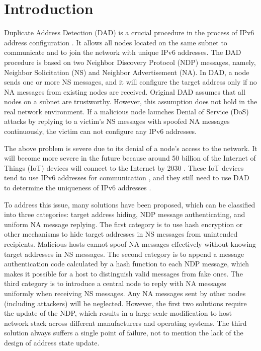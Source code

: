 \documentclass[a4paper,fleqn]{cas-dc}
\begin{document}
\maketitle

\section{Introduction}
    Duplicate Address Detection (DAD) is a crucial procedure in the process of IPv6 address configuration \cite{slaac}. It allows all nodes located on the same subnet to communicate and to join the network with unique IPv6 addresses. The DAD procedure is based on two Neighbor Discovery Protocol (NDP) \cite{NDP} messages, namely, Neighbor Solicitation (NS) and Neighbor Advertisement (NA).
    In DAD, a node sends one or more NS messages, and it will configure the target address only if no NA messages from existing nodes are received.
    Original DAD assumes that all nodes on a subnet are trustworthy. However, this assumption does not hold in the real network environment. 
    If a malicious node launches Denial of Service (DoS) attacks by replying to a victim's NS messages with spoofed NA messages continuously, the victim can not configure any IPv6 addresses.

    The above problem is severe due to its denial of a node's access to the network. 
    It will become more severe in the future because around 50 billion of the Internet of Things (IoT) devices will connect to the Internet by 2030 \cite{IOT3}. These IoT devices tend to use IPv6 addresses for communication  \cite{IoT-IPv6,LoWPAN}, and they still need to use DAD to determine the uniqueness of IPv6 addresses \cite{ipv6-iot}.
    
    To address this issue, many solutions have been proposed, which can be classified into three categories: target address hiding, NDP message authenticating, and uniform NA message replying. The first category is to use hash encryption or other mechanisms to hide target addresses in NS messages from unintended recipients. Malicious hosts cannot spoof NA messages effectively without knowing target addresses in NS messages.
    The second category is to append a message authentication code calculated by a hash function to each NDP message, which makes it possible for a host to distinguish valid messages from fake ones.
    The third category is to introduce a central node to reply with NA messages uniformly when receiving NS messages. Any NA messages sent by other nodes (including attackers) will be neglected.
    However, the first two solutions require the update of the NDP, which results in a large-scale modification to host network stack across different manufacturers and operating systems. The third solution always suffers a single point of failure, not to mention the lack of the design of address state update.
    
\end{document}
